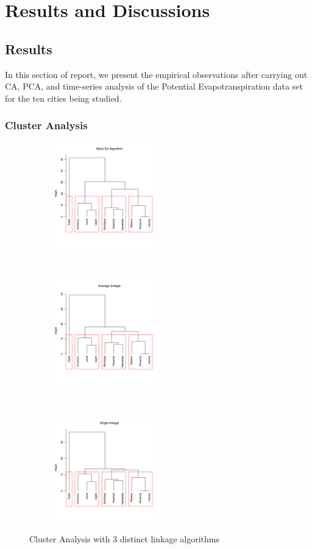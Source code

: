 \documentclass[12pt,a4paper]{article}
\begin{document}
\section{Results and Discussions}
\subsection{Results}
In this section of report, we present the empirical observations after carrying out CA, PCA,  and time-series analysis of the Potential Evapotranspiration data set for the ten cities being studied.
\subsubsection{Cluster Analysis}
\begin{figure}[!h]
    \centering
    \begin{subfigure}[t]{0.3\textwidth}
        \centering
        \includegraphics[height=1.8in]{./gaphics/q001_a.png}
        \caption{}
    \end{subfigure}%
    ~ 
    \begin{subfigure}[t]{0.3\textwidth}
        \centering
        \includegraphics[height=1.8in]{./gaphics/q001_b.png}
        \caption{}
    \end{subfigure}%
    ~ 
    \begin{subfigure}[t]{0.3\textwidth}
        \centering
        \includegraphics[height=1.8in]{./gaphics/q001_c.png}
        \caption{}
    \end{subfigure}
    \caption{Cluster Analysis with 3 distinct linkage algorithms}
     \label{fig:cluster_algorithms}
\end{figure}
\end{document}
